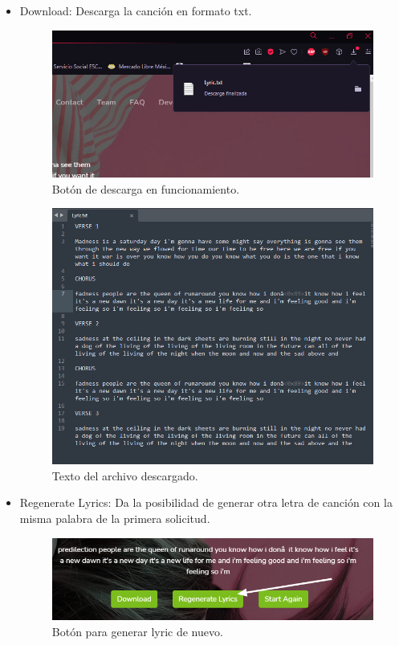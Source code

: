 \documentclass[12pt, a4paper, titlepage]{article}
\begin{document}
	\begin{itemize}
		\item Download: Descarga la canción en formato txt.
		
		\begin{figure}[H] 
			\includegraphics[width=13.5cm]{./Imagenes/Capturas/Download.png}
			\centering \caption{Botón de descarga en funcionamiento.}
		\end{figure}
	
		\begin{figure}[H] 
			\includegraphics[width=13.5cm]{./Imagenes/Capturas/Textodescargado.png}
			\centering \caption{Texto del archivo descargado.}
		\end{figure}
		
		\item Regenerate Lyrics: Da la posibilidad de generar otra letra de canción con la misma palabra de la primera solicitud.
		
		\begin{figure}[H] 
			\includegraphics[width=13.5cm]{./Imagenes/Capturas/BotRegen.png}
			\centering \caption{Botón para generar lyric de nuevo.}
		\end{figure}
	

\end{itemize}
\end{document}
